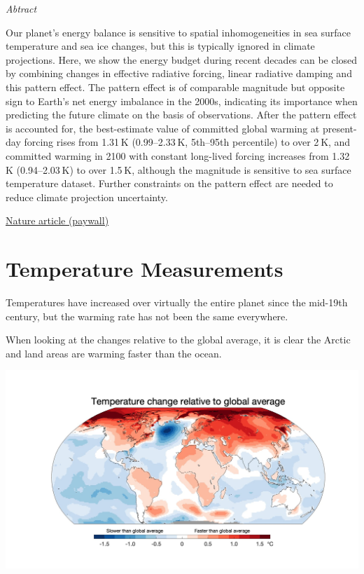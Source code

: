 \documentclass[
]{book}
\begin{document}
\emph{Abtract}

Our planet's energy balance is sensitive to spatial inhomogeneities in sea surface temperature and sea ice changes, but this is typically ignored in climate projections. Here, we show the energy budget during recent decades can be closed by combining changes in effective radiative forcing, linear radiative damping and this pattern effect. The pattern effect is of comparable magnitude but opposite sign to Earth's net energy imbalance in the 2000s, indicating its importance when predicting the future climate on the basis of observations. After the pattern effect is accounted for, the best-estimate value of committed global warming at present-day forcing rises from 1.31 K (0.99--2.33 K, 5th--95th percentile) to over 2 K, and committed warming in 2100 with constant long-lived forcing increases from 1.32 K (0.94--2.03 K) to over 1.5 K, although the magnitude is sensitive to sea surface temperature dataset. Further constraints on the pattern effect are needed to reduce climate projection uncertainty.

\href{https://www.nature.com/articles/s41558-020-00955-x}{Nature article (paywall)}

\hypertarget{temperature-measurements}{%
\chapter{Temperature Measurements}\label{temperature-measurements}}

Temperatures have increased over virtually the entire planet since the mid-19th century, but the warming rate has not been the same everywhere.

When looking at the changes relative to the global average, it is clear the Arctic and land areas are warming faster than the ocean.

\includegraphics{fig/World_Temp_Change_Speed.jpeg}
\end{document}
